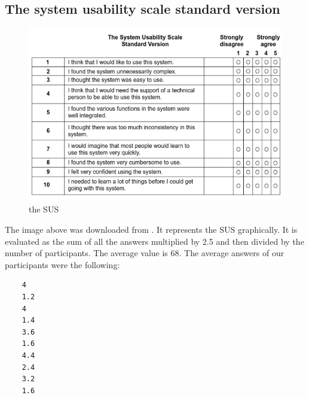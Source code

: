 \appendixpageoff
\begin{appendices}
\chapter{The system usability scale standard version}
\begin{figure}[ht!]
  \centering
  \includegraphics[width=\textwidth]{Images/SUS.png}
  \caption{the SUS}
  \label{architectureOverview}
\end{figure}
The image above was downloaded from \cite{susImage}. It represents the SUS graphically. It is evaluated as the sum of all the answers multiplied by 2.5 and then divided by the number of participants. The average value is 68. The average answers of our participants were the following: 
\lstset{style=sharpc, numbers=left}
\begin{lstlisting}
	4
	1.2
	4
	1.4
	3.6
	1.6
	4.4
	2.4
	3.2
	1.6
\end{lstlisting}
\end{appendices}
